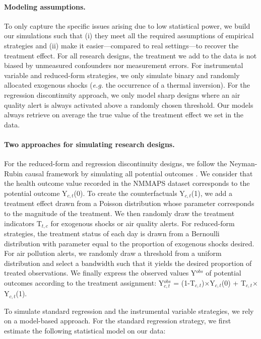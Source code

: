 \documentclass[12pt]{article}
\begin{document}
        \paragraph{Modeling assumptions.} To only capture the specific issues arising due to low statistical power, we build our simulations such that (i) they meet all the required assumptions of empirical strategies and (ii) make it easier---compared to real settings---to recover the treatment effect. For all research designs, the treatment we add to the data is not biased by unmeasured confounders nor measurement errors. For instrumental variable and reduced-form strategies, we only simulate binary and randomly allocated exogenous shocks (\textit{e.g.} the occurrence of a thermal inversion). For the regression discontinuity approach, we only model sharp designs where an air quality alert is always activated above a randomly chosen threshold. Our models always retrieve on average the true value of the treatment effect we set in the data.
     
        \paragraph{Two approaches for simulating research designs.}
        
        For the reduced-form and regression discontinuity designs, we follow the Neyman-Rubin causal framework by simulating all potential outcomes \citep{rubin_estimating_1974}. We consider that the health outcome value recorded in the NMMAPS dataset corresponds to the potential outcome Y$_{c,t}$(0). To create the counterfactuals Y$_{c,t}$(1), we add a treatment effect drawn from a Poisson distribution whose parameter corresponds to the magnitude of the treatment. We then randomly draw the treatment indicators T$_{t,c}$ for exogenous shocks or air quality alerts. For reduced-form strategies, the treatment status of each day is drawn from a Bernoulli distribution with parameter equal to the proportion of exogenous shocks desired. For air pollution alerts, we randomly draw a threshold from a uniform distribution and select a bandwidth such that it yields the desired proportion of treated observations. We finally express the observed values Y$^{obs}$ of potential outcomes according to the treatment assignment: Y$^{obs}_{c,t}$ = (1-T$_{c,t}$)$\times$Y$_{c,t}$(0) + T$_{c,t}$$\times$Y$_{c,t}$(1).
      
        To simulate standard regression and the instrumental variable strategies, we rely on a model-based approach. For the standard regression strategy, we first estimate the following statistical model on our data:
        
\end{document}
